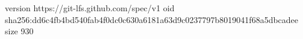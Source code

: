 version https://git-lfs.github.com/spec/v1
oid sha256:dd6c4fb4bd540fab4f0dc0c630a6181a63d9c0237797b8019041f68a5dbcadee
size 930
